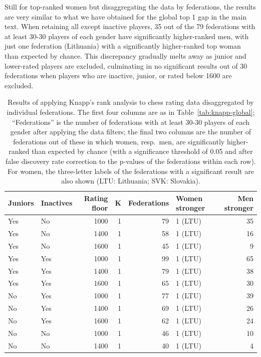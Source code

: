 \documentclass[9pt,twoside,lineno]{pnas-new}
\begin{document}
Still for top-ranked women but disaggregating the data by federations, the results are very similar to what we have obtained for the global top 1 gap in the main text. When retaining all except inactive players, 35 out of the 79 federations with at least 30-30 players of each gender have significantly higher-ranked men, with just one federation (Lithuania) with a significantly higher-ranked top woman than expected by chance. This discrepancy gradually melts away as junior and lower-rated players are excluded, culminating in no significant results out of 30 federations when players who are inactive, junior, or rated below 1600 are excluded.

\begin{table}[!ht]
\centering
\caption{Results of applying Knapp's rank analysis to chess rating data disaggregated by individual federations. The first four columns are as in Table~\ref{tab:knapp-global}; ``Federations'' is the number of federations with at least 30-30 players of each gender after applying the data filters; the final two columns are the number of federations out of these in which women, resp.~men, are significantly higher-ranked than expected by chance (with a significance threshold of 0.05 and after false discovery rate correction to the p-values of the federations within each row). For women, the three-letter labels of the federations with a significant result are also shown (LTU: Lithuania; SVK: Slovakia).}
\label{tab:knapp-per-fed}
\begin{tabular}[t]{llrrrlr}
\toprule
Juniors & Inactives & Rating floor & K & Federations & Women stronger & Men stronger\\
\midrule
Yes & No & 1000 & 1 & 79 & 1 (LTU) & 35\\
Yes & No & 1400 & 1 & 58 & 1 (LTU) & 16\\
Yes & No & 1600 & 1 & 45 & 1 (LTU) & 9\\
Yes & Yes & 1000 & 1 & 99 & 1 (LTU) & 65\\
Yes & Yes & 1400 & 1 & 79 & 1 (LTU) & 38\\
Yes & Yes & 1600 & 1 & 65 & 1 (LTU) & 30\\
No & Yes & 1000 & 1 & 77 & 1 (LTU) & 39\\
No & Yes & 1400 & 1 & 69 & 1 (LTU) & 26\\
No & Yes & 1600 & 1 & 62 & 1 (LTU) & 24\\
No & No & 1000 & 1 & 46 & 1 (LTU) & 10\\
No & No & 1400 & 1 & 40 & 1 (LTU) & 4\\

\end{tabular}
\end{table}
\end{document}
